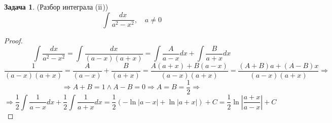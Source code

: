\documentclass[12pt]{article}
\newcommand{\RN}[1]{%
	\textup{\uppercase\expandafter{\romannumeral#1}}%
}
\theoremstyle{definition}
\newtheorem{problem}{Задача}
\DeclareMathOperator{\dint}{\displaystyle\int}
\begin{document}
\begin{problem}(Разбор интеграла ($\RN{2}$)) 
	$$
		\dint \dfrac{dx}{a^2 - x^2}, \quad a \neq 0
	$$
\end{problem}
\begin{proof}
	$$
		\dint \dfrac{dx}{a^2 - x^2} = \dint \dfrac{dx}{(a - x)(a + x)} = \dint \dfrac{A}{a-x}dx + \dint \dfrac{B}{a + x}dx
	$$
	$$
		\dfrac{1}{(a-x)(a+x)} = \dfrac{A}{(a-x)} + \dfrac{B}{(a+x)} =\dfrac{A(a+x) + B(a-x)}{(a-x)(a+x)} = \dfrac{(A+B)a + (A - B)x}{(a-x)(a+x)} \Rightarrow 
	$$
	$$
		\Rightarrow A + B = 1 \wedge A - B = 0 \Rightarrow A = B = \dfrac{1}{2} \Rightarrow 
	$$
	$$
		\Rightarrow \dfrac{1}{2}\dint\dfrac{1}{a-x}dx + \dfrac{1}{2}\dint \dfrac{1}{a + x}dx = \dfrac{1}{2}\left(-\ln{|a-x|} + \ln{|a+x|}\right) + C = \dfrac{1}{2}\ln{\left| \dfrac{a+x}{a-x}\right|} + C
	$$
\end{proof}
\end{document}
